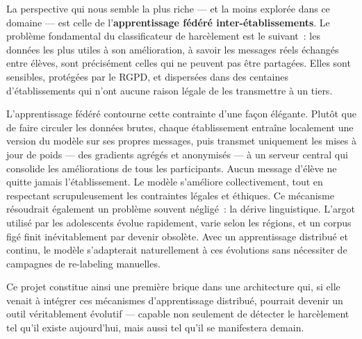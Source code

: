 \medskip

La perspective qui nous semble la plus riche — et la moins explorée dans ce domaine —
est celle de l'\textbf{apprentissage fédéré inter-établissements}.
Le problème fondamental du classificateur de harcèlement est le suivant~:
les données les plus utiles à son amélioration, à savoir les messages réels échangés
entre élèves, sont précisément celles qui ne peuvent pas être partagées.
Elles sont sensibles, protégées par le RGPD, et dispersées dans des centaines
d'établissements qui n'ont aucune raison légale de les transmettre à un tiers.

L'apprentissage fédéré contourne cette contrainte d'une façon élégante.
Plutôt que de faire circuler les données brutes, chaque établissement entraîne
localement une version du modèle sur ses propres messages, puis transmet
uniquement les mises à jour de poids — des gradients agrégés et anonymisés —
à un serveur central qui consolide les améliorations de tous les participants.
Aucun message d'élève ne quitte jamais l'établissement.
Le modèle s'améliore collectivement, tout en respectant scrupuleusement
les contraintes légales et éthiques.
Ce mécanisme résoudrait également un problème souvent négligé~: la dérive linguistique.
L'argot utilisé par les adolescents évolue rapidement, varie selon les régions,
et un corpus figé finit inévitablement par devenir obsolète.
Avec un apprentissage distribué et continu, le modèle s'adapterait
naturellement à ces évolutions sans nécessiter de campagnes de re-labeling manuelles.

\medskip

Ce projet constitue ainsi une première brique dans une architecture qui,
si elle venait à intégrer ces mécanismes d'apprentissage distribué,
pourrait devenir un outil véritablement évolutif — capable non seulement
de détecter le harcèlement tel qu'il existe aujourd'hui,
mais aussi tel qu'il se manifestera demain.

